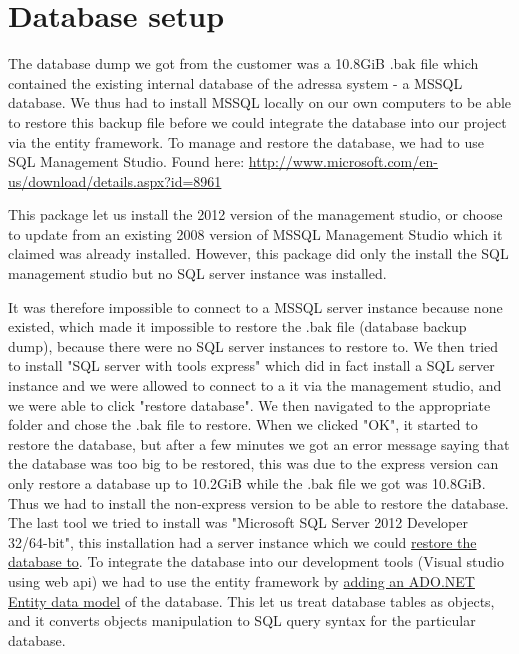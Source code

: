\section{Database setup}\label{dbSetup}
The database dump we got from the customer was a 10.8GiB .bak file which contained the existing internal database of the adressa system - a MSSQL database.
We thus had to install MSSQL locally on our own computers to be able to restore this backup file before we could integrate the database into our project via the entity framework. To manage and restore the database, we had to use SQL Management Studio. Found here: \href{http://www.microsoft.com/en-us/download/details.aspx?id=8961}{http://www.microsoft.com/en-us/download/details.aspx?id=8961}

This package let us install the 2012 version of the management studio, or choose to update from an existing 2008 version of MSSQL Management Studio which it claimed was already installed. However, this package did only the install the SQL management studio but no SQL server instance was installed.

It was therefore impossible to connect to a MSSQL server instance because none existed, which made it impossible to restore the .bak file (database backup dump), because there were no SQL server instances to restore to.
We then tried to install "SQL server with tools express" which did in fact install a SQL server instance and we were allowed to connect to a it via the management studio, and we were able to click "restore database". We then navigated to the appropriate folder and chose the .bak file to restore. When we clicked "OK", it started to restore the database, but after a few minutes we got an error message saying that the database was too big to be restored, this was due to the express version can only restore a database up to 10.2GiB while the .bak file we got was 10.8GiB. Thus we had to install the non-express version to be able to restore the database. The last tool we tried to install was "Microsoft SQL Server 2012 Developer 32/64-bit", this installation had a server instance which we could \href{http://www.katieandemil.com/sql-server-2012-restore-database-backup-file}{restore the database to}.
To integrate the database into our development tools (Visual studio using web api) we had to use the entity framework by \href{http://www.entityframeworktutorial.net/EntityFramework5/entity-framework5-introduction.aspx}{adding an ADO.NET Entity data model} of the database.
This let us treat database tables as objects, and it converts objects manipulation to SQL query syntax for the particular database.